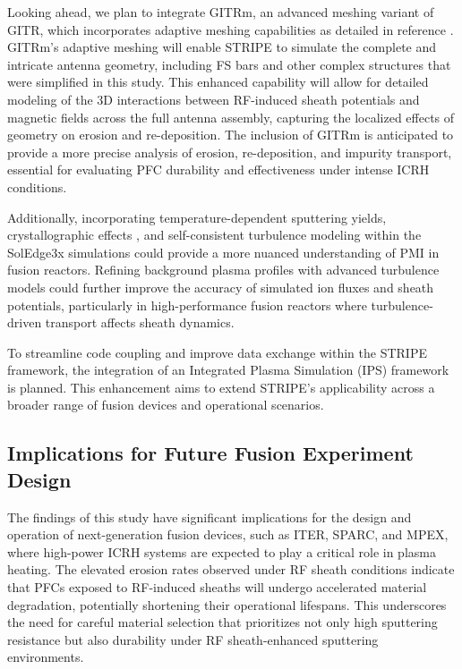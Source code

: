 \documentclass[10pt]{iopart}
\begin{document}
Looking ahead, we plan to integrate GITRm, an advanced meshing variant of GITR, which incorporates adaptive meshing capabilities as detailed in reference . GITRm’s adaptive meshing will enable STRIPE to simulate the complete and intricate antenna geometry, including FS bars and other complex structures that were simplified in this study. This enhanced capability will allow for detailed modeling of the 3D interactions between RF-induced sheath potentials and magnetic fields across the full antenna assembly, capturing the localized effects of geometry on erosion and re-deposition. The inclusion of GITRm is anticipated to provide a more precise analysis of erosion, re-deposition, and impurity transport, essential for evaluating PFC durability and effectiveness under intense ICRH conditions. 

Additionally, incorporating temperature-dependent sputtering yields, crystallographic effects \cite{Samolyuk:2023}, and self-consistent turbulence modeling within the SolEdge3x simulations \cite{Bufferand:2024} could provide a more nuanced understanding of PMI in fusion reactors. Refining background plasma profiles with advanced turbulence models could further improve the accuracy of simulated ion fluxes and sheath potentials, particularly in high-performance fusion reactors where turbulence-driven transport affects sheath dynamics.

To streamline code coupling and improve data exchange within the STRIPE framework, the integration of an Integrated Plasma Simulation (IPS) framework \cite{Hoenen:2015} is planned. This enhancement aims to extend STRIPE’s applicability across a broader range of fusion devices and operational scenarios. 

\subsection{Implications for Future Fusion Experiment Design}
\label{subssec:76}
The findings of this study have significant implications for the design and operation of next-generation fusion devices, such as ITER, SPARC, and MPEX, where high-power ICRH systems are expected to play a critical role in plasma heating. The elevated erosion rates observed under RF sheath conditions indicate that PFCs exposed to RF-induced sheaths will undergo accelerated material degradation, potentially shortening their operational lifespans. This underscores the need for careful material selection that prioritizes not only high sputtering resistance but also durability under RF sheath-enhanced sputtering environments.
\end{document}
